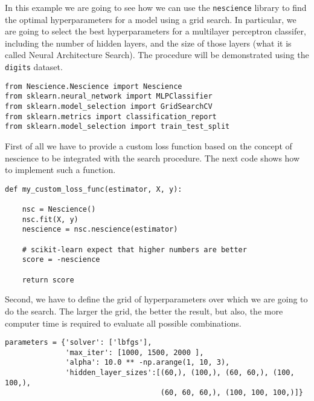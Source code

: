 \begin{example}
\label{ex:hyper_search}

In this example we are going to see how we can use the \texttt{nescience} library to find the optimal hyperparameters for a model using a grid search. In particular, we are going to select the best hyperparameters for a multilayer perceptron classifer, including the number of hidden layers, and the size of those layers (what it is called Neural Architecture Search). The procedure will be demonstrated using the \texttt{digits} dataset.

\begin{sourcecode}
{\scriptsize \begin{verbatim}
from Nescience.Nescience import Nescience
from sklearn.neural_network import MLPClassifier
from sklearn.model_selection import GridSearchCV
from sklearn.metrics import classification_report
from sklearn.model_selection import train_test_split
\end{verbatim}}
\end{sourcecode}

First of all we have to provide a custom loss function based on the concept of nescience to be integrated with the search procedure. The next code shows how to implement such a function.

\begin{sourcecode}
{\scriptsize \begin{verbatim}
def my_custom_loss_func(estimator, X, y):
    
    nsc = Nescience()
    nsc.fit(X, y)
    nescience = nsc.nescience(estimator)
    
    # scikit-learn expect that higher numbers are better
    score = -nescience
    
    return score
\end{verbatim}}
\end{sourcecode}

Second, we have to define the grid of hyperparameters over which we are going to do the search. The larger the grid, the better the result, but also, the more computer time is required to evaluate all possible combinations.

\begin{sourcecode}
{\scriptsize \begin{verbatim}
parameters = {'solver': ['lbfgs'],
              'max_iter': [1000, 1500, 2000 ], 
              'alpha': 10.0 ** -np.arange(1, 10, 3),
              'hidden_layer_sizes':[(60,), (100,), (60, 60,), (100, 100,), 
                                    (60, 60, 60,), (100, 100, 100,)]}
\end{verbatim}}
\end{sourcecode}


\end{example}
